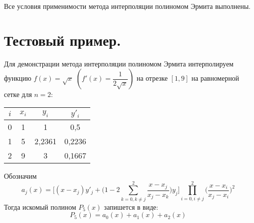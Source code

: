 \documentclass[a4paper, 12pt]{article}
\begin{document}
	Все условия применимости метода интерполяции полиномом Эрмита выполнены.
	
	\section{Тестовый пример.}
	
	Для демонстрации метода интерполяции полиномом Эрмита интерполируем функцию $f(x)=\sqrt{x}$  $(f'(x)=\dfrac{1}{2\sqrt{x}})$ на отрезке $[1,9]$ на равномерной сетке для $n=2$:
	\begin{center}
		\begin{tabular}{ | c | c | c | c | }
			\hline
			$i$ & $x_i$ & $y_i$ & $y'_i$ \\ \hline
			0 & 1 & 1 & 0,5 \\ \hline
			1 & 5 & 2,2361 & 0,2236 \\ \hline
			2 & 9 & 3 & 0,1667 \\
			\hline
		\end{tabular}
	\end{center}
	Обозначим 
	\begin{equation}
		a_j(x)=\bigg[(x-x_j)y'_j+\bigg(1-2\sum\limits_{k=0,k\neq j}^2\frac{x-x_j}{x_j-x_k}\bigg)y_j\bigg]\prod\limits_{i=0,i\neq j}^2\bigg(\frac{x-x_i}{x_j-x_i}\bigg)^2
	\end{equation}
	Тогда искомый полином $P_5(x)$ запишется в виде:
	\begin{equation}
		P_5(x)=a_0(x)+a_1(x)+a_2(x)
	\end{equation}
\end{document}
